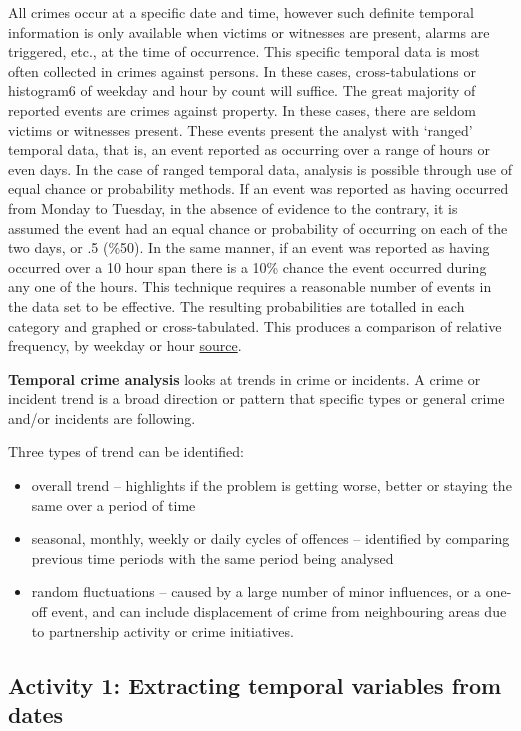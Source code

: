\documentclass[]{book}
\providecommand{\tightlist}{%
  \setlength{\itemsep}{0pt}\setlength{\parskip}{0pt}}
\theoremstyle{definition}
\theoremstyle{definition}
\theoremstyle{definition}
\theoremstyle{remark}
\begin{document}
All crimes occur at a specific date and time, however such definite
temporal information is only available when victims or witnesses are
present, alarms are triggered, etc., at the time of occurrence. This
specific temporal data is most often collected in crimes against
persons. In these cases, cross-tabulations or histogram6 of weekday and
hour by count will suffice. The great majority of reported events are
crimes against property. In these cases, there are seldom victims or
witnesses present. These events present the analyst with `ranged'
temporal data, that is, an event reported as occurring over a range of
hours or even days. In the case of ranged temporal data, analysis is
possible through use of equal chance or probability methods. If an event
was reported as having occurred from Monday to Tuesday, in the absence
of evidence to the contrary, it is assumed the event had an equal chance
or probability of occurring on each of the two days, or .5 (\%50). In
the same manner, if an event was reported as having occurred over a 10
hour span there is a 10\% chance the event occurred during any one of
the hours. This technique requires a reasonable number of events in the
data set to be effective. The resulting probabilities are totalled in
each category and graphed or cross-tabulated. This produces a comparison
of relative frequency, by weekday or hour
\href{http://cradpdf.drdc-rddc.gc.ca/PDFS/unc76/p530054.pdf}{source}.

\textbf{Temporal crime analysis} looks at trends in crime or incidents.
A crime or incident trend is a broad direction or pattern that specific
types or general crime and/or incidents are following.

Three types of trend can be identified:

\begin{itemize}
\tightlist
\item
  overall trend -- highlights if the problem is getting worse, better or
  staying the same over a period of time
\item
  seasonal, monthly, weekly or daily cycles of offences -- identified by
  comparing previous time periods with the same period being analysed
\item
  random fluctuations -- caused by a large number of minor influences,
  or a one-off event, and can include displacement of crime from
  neighbouring areas due to partnership activity or crime initiatives.
\end{itemize}

\hypertarget{activity-1-extracting-temporal-variables-from-dates}{%
\subsection{Activity 1: Extracting temporal variables from
dates}\label{activity-1-extracting-temporal-variables-from-dates}}
\end{document}
